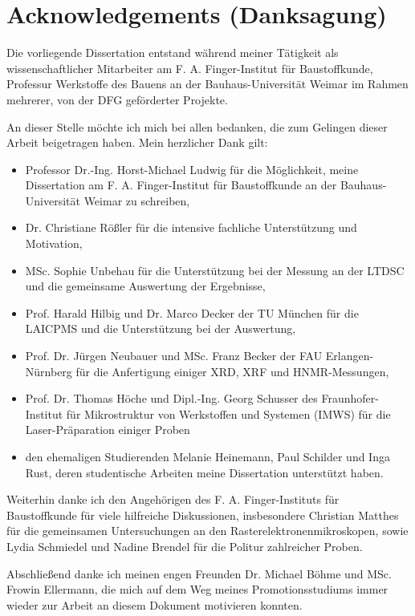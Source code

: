 \chapter{Acknowledgements (Danksagung)}
Die vorliegende Dissertation entstand während meiner Tätigkeit als wissenschaftlicher Mitarbeiter
am F. A. Finger-Institut für Baustoffkunde, Professur Werkstoffe des Bauens an der Bauhaus-Universität Weimar im Rahmen mehrerer, von der DFG geförderter Projekte.

An dieser Stelle möchte ich mich bei allen bedanken, die zum Gelingen dieser Arbeit beigetragen haben. Mein herzlicher Dank gilt:

\begin{itemize}
    \item Professor Dr.-Ing. Horst-Michael Ludwig für die Möglichkeit, meine Dissertation am F. A. Finger-Institut für Baustoffkunde an der Bauhaus-Universität Weimar zu schreiben,
    \item Dr. Christiane Rößler für die intensive fachliche Unterstützung und Motivation,
    \item MSc. Sophie Unbehau für die Unterstützung bei der Messung an der \acs*{LTDSC} und die gemeinsame Auswertung der Ergebnisse,
    \item Prof. Harald Hilbig und Dr. Marco Decker der TU München für die \acs*{LAICPMS} und die Unterstützung bei der Auswertung,
    \item Prof. Dr. Jürgen Neubauer und MSc. Franz Becker der FAU Erlangen-Nürnberg für die Anfertigung einiger \acs*{XRD}, \acs*{XRF} und \acs*{HNMR}-Messungen,
    \item Prof. Dr. Thomas Höche und Dipl.-Ing. Georg Schusser des Fraunhofer-Institut für Mikrostruktur von Werkstoffen und Systemen (IMWS) für die Laser-Präparation einiger Proben
    \item den ehemaligen Studierenden Melanie Heinemann, Paul Schilder und Inga Rust, deren studentische Arbeiten meine Dissertation unterstützt haben.
\end{itemize}

Weiterhin danke ich den Angehörigen des F. A. Finger-Instituts für Baustoffkunde für viele hilfreiche Diskussionen, insbesondere Christian Matthes für die gemeinsamen Untersuchungen an den Rasterelektronenmikroskopen, sowie Lydia Schmiedel und Nadine Brendel für die Politur zahlreicher Proben.

Abschließend danke ich meinen engen Freunden Dr. Michael Böhme und MSc. Frowin Ellermann, die mich auf dem Weg meines Promotionsstudiums immer wieder zur Arbeit an diesem Dokument motivieren konnten.
